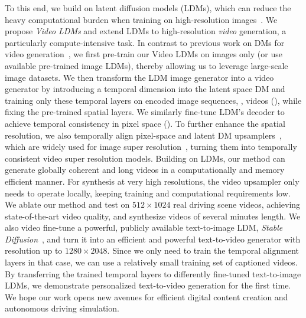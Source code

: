 To this end, we build on latent diffusion models (LDMs), which can reduce the heavy computational burden when training on high-resolution images~\cite{rombach2021highresolution}. 
We propose \emph{Video LDMs} and extend LDMs to high-resolution \emph{video} generation, a particularly compute-intensive task. In contrast to previous work on DMs for video generation~\cite{yang2022video,ho2022video,hoeppe2022diffusion,voleti2022mcvd,harvey2022flexible}, we first pre-train our Video LDMs on images only (or use available pre-trained image LDMs), thereby allowing us to leverage large-scale image datasets. 
We then transform the LDM image generator into a video generator by introducing a temporal dimension into the latent space DM and training only these temporal layers on encoded image sequences, \ie, videos (), while fixing the pre-trained spatial layers.
We similarly fine-tune LDM's decoder to achieve temporal consistency in pixel space ().
To further enhance the spatial resolution, we also temporally align pixel-space and latent DM upsamplers~\cite{ho2021cascaded}, which are widely used for image super resolution~\cite{saharia2021image,li2022srdiff,saharia2022imagen,rombach2021highresolution}, turning them into temporally consistent video super resolution models.
Building on LDMs, our method can generate globally coherent and long videos in a computationally and memory efficient manner. For synthesis at very high resolutions, the video upsampler only needs to operate locally, keeping training and computational requirements low.
We ablate our method and test on $512\times1024$ real driving scene videos, achieving state-of-the-art video quality, and synthesize videos of several minutes length. 
We also video fine-tune a powerful, publicly available text-to-image LDM, \textit{Stable Diffusion}~\cite{rombach2021highresolution}, and turn it into an efficient and powerful text-to-video generator with resolution up to $1280\times2048$. 
Since we only need to train the temporal alignment layers in that case, we can use a relatively small training set of captioned videos. 
By transferring the trained temporal layers to differently fine-tuned text-to-image LDMs, we demonstrate personalized text-to-video generation for the first time.
We hope our work opens new avenues for efficient digital content creation and autonomous driving simulation.


